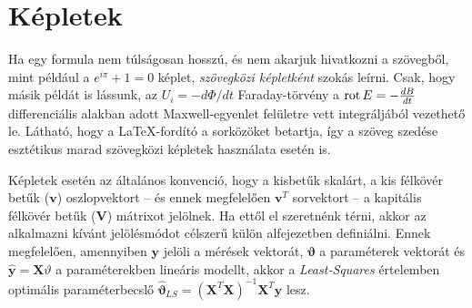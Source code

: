 \section{Képletek}
Ha egy formula nem túlságosan hosszú, és nem akarjuk hivatkozni a szövegből, mint például a $e^{i\pi}+1=0$ képlet, \emph{szövegközi képletként} szokás leírni. Csak, hogy másik példát is lássunk, az $U_i=-d\Phi/dt$ Faraday-törvény a $\operatorname{rot} E=-\frac{dB}{dt}$ differenciális alakban adott Maxwell-egyenlet felületre vett integráljából vezethető le. Látható, hogy a \LaTeX-fordító a sorközöket betartja, így a szöveg szedése esztétikus marad szövegközi képletek használata esetén is.

Képletek esetén az általános konvenció, hogy a kisbetűk skalárt, a kis félkövér betűk ($\mathbf{v}$) oszlopvektort -- és ennek megfelelően $\mathbf{v}^T$ sorvektort -- a kapitális félkövér betűk ($\mathbf{V}$) mátrixot jelölnek. Ha ettől el szeretnénk térni, akkor az alkalmazni kívánt jelölésmódot célszerű külön alfejezetben definiálni. Ennek megfelelően, amennyiben $\mathbf{y}$ jelöli a mérések vektorát, $\mathbf{\vartheta}$ a paraméterek vektorát és $\hat{\mathbf{y}}=\mathbf{X}\vartheta$ a paraméterekben lineáris modellt, akkor a \emph{Least-Squares} értelemben optimális paraméterbecslő $\hat{\mathbf{\vartheta}}_{LS}=(\mathbf{X}^T\mathbf{X})^{-1}\mathbf{X}^T\mathbf{y}$ lesz.

